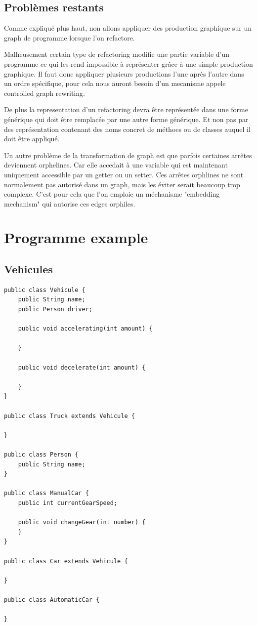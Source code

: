 \documentclass[a4paper, 10pt]{article}
\begin{document}
\subsection{Problèmes restants}
Comme expliqué plus haut, non allons appliquer des production graphique sur un graph de programme lorsque l'on refactore.

Malheusement certain type de refactoring modifie une partie variable d'un programme ce qui les rend impossible à représenter grâce à une simple production graphique.
Il faut donc appliquer plusieurs productions l'une après l'autre dans un ordre spécifique, pour cela nous auront besoin d'un mecanisme appele controlled graph rewriting.

De plus la representation d'un refactoring devra être représentée dans une forme générique qui doit être remplacée par une autre forme générique.
Et non pas par des représentation contenant des noms concret de méthoes ou de classes auquel il doit être appliqué.

Un autre problème de la transformation de graph est que parfois certaines arrêtes deviennent orphelines.
Car elle accedait à une variable qui est maintenant uniquement accessible par un getter ou un setter.
Ces arrêtes orphlines ne sont normalement pas autorisé dans un graph, mais les éviter serait beaucoup trop complexe.
C'est pour cela que l'on emploie un méchanisme "embedding mechanism" qui autorise ces edges orphiles.

\newpage
\section{Programme example}

\subsection{Vehicules}

\begin{lstlisting}[frame=single]
public class Vehicule {
	public String name;
	public Person driver;

	public void accelerating(int amount) {

	}

	public void decelerate(int amount) {
	
	}
}

public class Truck extends Vehicule {

}

public class Person {
	public String name;
}

public class ManualCar {
	public int currentGearSpeed;
	
	public void changeGear(int number) {
	}
}

public class Car extends Vehicule {

}

public class AutomaticCar {

}
\end{lstlisting}
\end{document}
